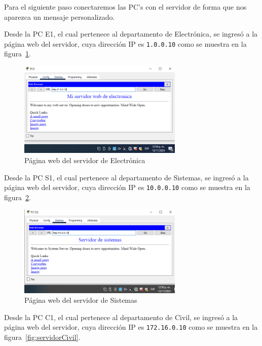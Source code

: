         Para el siguiente paso conectaremos las PC's con el servidor de forma que nos aparezca un mensaje personalizado.

        Desde la PC E1, el cual pertenece al departamento de Electrónica, se ingresó a la página web del servidor, cuya dirección IP es \texttt{1.0.0.10} como se muestra en la figura~\ref{fig:servidorElectronica}.


        \begin{figure}[H]
            \centering
            \includegraphics[width=0.7\textwidth]{img/serverElectronica.PNG}
            \caption{Página web del servidor de Electrónica}
            \label{fig:servidorElectronica}
        \end{figure}

        Desde la PC S1, el cual pertenece al departamento de Sistemas, se ingresó a la página web del servidor, cuya dirección IP es \texttt{10.0.0.10} como se muestra en la figura~\ref{fig:servidorSistemas}.

        \begin{figure}[H]
            \centering
            \includegraphics[width=0.7\textwidth]{img/Servidor de sistemas.PNG}
            \caption{Página web del servidor de Sistemas}
            \label{fig:servidorSistemas}
        \end{figure}

        Desde la PC C1, el cual pertenece al departamento de Civil, se ingresó a la página web del servidor, cuya dirección IP es \texttt{172.16.0.10} como se muestra en la figura~\ref{fig:servidorCivil}.

